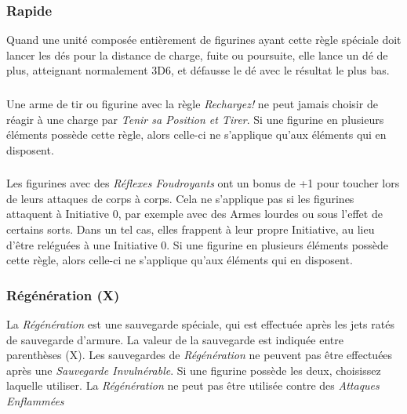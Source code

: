 \subsubsection*{Rapide}

Quand une unité composée entièrement de figurines ayant cette règle spéciale doit lancer les dés pour la distance de charge, fuite ou poursuite, elle lance un dé de plus, atteignant normalement 3D6, et défausse le dé avec le résultat le plus bas.

\subsubsection*{}

Une arme de tir ou figurine avec la règle \emph{Rechargez!} ne peut jamais choisir de réagir à une charge par \emph{Tenir sa Position et Tirer}. Si une figurine en plusieurs éléments possède cette règle, alors celle-ci ne s'applique qu'aux éléments qui en disposent.

\subsubsection*{}

Les figurines avec des \emph{Réflexes Foudroyants} ont un bonus de +1 pour toucher lors de leurs attaques de corps à corps. Cela ne s'applique pas si les figurines attaquent à Initiative 0, par exemple avec des Armes lourdes ou sous l'effet de certains sorts. Dans un tel cas, elles frappent à leur propre Initiative, au lieu d'être reléguées à une Initiative 0. Si une figurine en plusieurs éléments possède cette règle, alors celle-ci ne s'applique qu'aux éléments qui en disposent.

\subsubsection*{Régénération (X)}

La \emph{Régénération} est une sauvegarde spéciale, qui est effectuée après les jets ratés de sauvegarde d'armure. La valeur de la sauvegarde est indiquée entre parenthèses (X). Les sauvegardes de \emph{Régénération} ne peuvent pas être effectuées après une \emph{Sauvegarde Invulnérable}. Si une figurine possède les deux, choisissez laquelle utiliser. La \emph{Régénération} ne peut pas être utilisée contre des \emph{Attaques Enflammées} 

